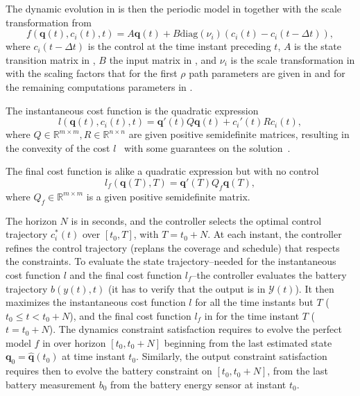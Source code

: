 The dynamic evolution in  is then the periodic model in  together with the scale transformation from 
\begin{equation}\label{eq:perf-model-in-mpc}
  f(\mathbf{q}(t),c_i(t),t)=A\mathbf{q}(t)+B\mathrm{diag}(\nu_i)(c_i(t)-c_i(t-\Delta t)),
\end{equation}
where $c_i(t-\Delta t)$ is the control at the time instant preceding $t$, $A$ is the state transition matrix in , $B$ the input matrix in , and $\nu_i$ is the scale transformation in  with the scaling factors that for the first $\rho$ path parameters are given in  and for the remaining computations parameters in .

The instantaneous cost function is the quadratic expression
\begin{equation}\label{eq:insta-cost-mpc}
  l(\mathbf{q}(t),c_i(t),t)=\mathbf{q}'(t)Q\mathbf{q}(t)+c_i'(t)Rc_i(t),
\end{equation}
where $Q\in\mathbb{R}^{m\times m},R\in\mathbb{R}^{n\times n}$ are given positive semidefinite matrices, resulting in the convexity of the cost $l$~\citep{nocedal2006numerical} with some guarantees on the solution~\citep{beck2014introduction}.

The final cost function is alike a quadratic expression but with no control
\begin{equation}\label{eq:final-cost-mpc}
  l_f(\mathbf{q}(T),T)=\mathbf{q}'(T)Q_f\mathbf{q}(T),
\end{equation}
where $Q_f\in\mathbb{R}^{m\times m}$ is a given positive semidefinite matrix.

The horizon $N$ is in seconds, and the controller selects the optimal control trajectory $c_i^*(t)$ over $[t_0,T]$, with $T=t_0+N$. At each instant, the controller refines the control trajectory (replans the coverage and schedule) that respects the constraints. To evaluate the state trajectory--needed for the instantaneous cost function $l$ and the final cost function $l_f$--the controller evaluates the battery trajectory $b(y(t),t)$ (it has to verify that the output is in $\mathcal{Y}(t)$). It then maximizes the instantaneous cost function $l$ for all the time instants but $T$ ($t_0\leq t < t_0+N$), and the final cost function $l_f$ in  for the time instant $T$ ($t=t_0+N$).
The dynamics constraint satisfaction requires to evolve the perfect model $f$ in  over horizon $[t_0,t_0+N]$ beginning from the last estimated state $\mathbf{q}_0=\hat{\mathbf{q}}(t_0)$ at time instant $t_0$. Similarly, the output constraint satisfaction requires then to evolve the battery constraint on $[t_0,t_0+N]$, from the last battery measurement $b_0$ from the battery energy sensor at instant $t_0$.

